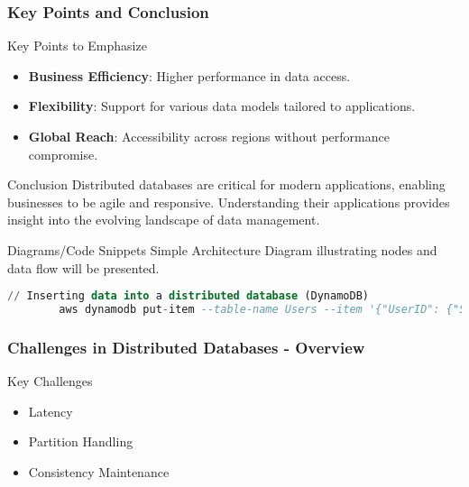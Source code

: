 \documentclass[aspectratio=169]{beamer}
\begin{document}
\begin{frame}[fragile]
    \frametitle{Key Points and Conclusion}
    \begin{block}{Key Points to Emphasize}
        \begin{itemize}
            \item \textbf{Business Efficiency}: Higher performance in data access.
            \item \textbf{Flexibility}: Support for various data models tailored to applications.
            \item \textbf{Global Reach}: Accessibility across regions without performance compromise.
        \end{itemize}
    \end{block}
    
    \begin{block}{Conclusion}
        Distributed databases are critical for modern applications, enabling businesses to be agile and responsive. Understanding their applications provides insight into the evolving landscape of data management.
    \end{block}
    
    \begin{block}{Diagrams/Code Snippets}
        Simple Architecture Diagram illustrating nodes and data flow will be presented.
        
        \begin{lstlisting}[language=SQL, basicstyle=\tiny]
        // Inserting data into a distributed database (DynamoDB)
        aws dynamodb put-item --table-name Users --item '{"UserID": {"S": "123"}, "Name": {"S": "Alice"}, "Location": {"S": "UK"}}'
        \end{lstlisting}
    \end{block}
\end{frame}

\begin{frame}[fragile]
    \frametitle{Challenges in Distributed Databases - Overview}
    
    \begin{block}{Key Challenges}
        \begin{itemize}
            \item Latency
            \item Partition Handling
            \item Consistency Maintenance
        \end{itemize}
    \end{block}
\end{frame}
\end{document}
